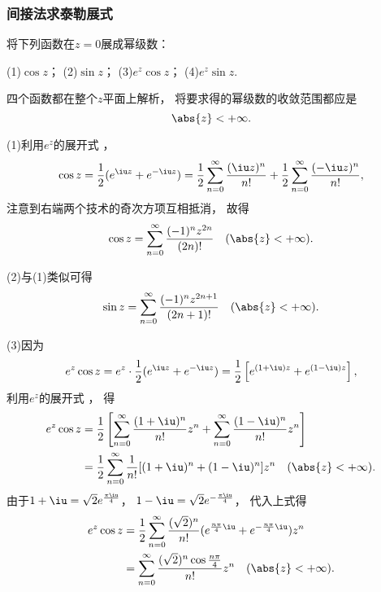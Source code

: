 \subsubsection{间接法求泰勒展式}
\begin{example}
将下列函数在\(z = 0\)展成幂级数：

(1)\(\cos z\)； \hfill (2)\(\sin z\)； \hfill (3)\(e^z \cos z\)； \hfill (4)\(e^z \sin z\).
\begin{solution}
四个函数都在整个\(z\)平面上解析，
将要求得的幂级数的收敛范围都应是\begin{equation*}
	\abs{z}<+\infty.
\end{equation*}

(1)利用\(e^z\)的展开式 ，
\begin{equation*}
	\cos z = \frac12 (e^{\iu z} + e^{-\iu z})
	= \frac12 \sum_{n=0}^\infty \frac{(\iu z)^n}{n!} + \frac12 \sum_{n=0}^\infty \frac{(-\iu z)^n}{n!},
\end{equation*}
注意到右端两个技术的奇次方项互相抵消，
故得\begin{equation}\label{equation:解析函数的级数表示.余弦函数的泰勒展式}
	\cos z = \sum_{n=0}^\infty \frac{(-1)^n z^{2n}}{(2n)!}
	\quad(\abs{z}<+\infty).
\end{equation}

(2)与(1)类似可得\begin{equation}\label{equation:解析函数的级数表示.正弦函数的泰勒展式}
	\sin z = \sum_{n=0}^\infty \frac{(-1)^n z^{2n+1}}{(2n+1)!}
	\quad(\abs{z}<+\infty).
\end{equation}

(3)因为\begin{equation*}
	e^z \cos z = e^z \cdot \frac12 (e^{\iu z} + e^{-\iu z})
	= \frac12 \left[e^{(1+\iu)z} + e^{(1-\iu)z}\right],
\end{equation*}
利用\(e^z\)的展开式 ，
得\begin{align*}
	e^z \cos z
	&= \frac12 \left[
			\sum_{n=0}^\infty \frac{(1+\iu)^n}{n!} z^n
			+ \sum_{n=0}^\infty \frac{(1-\iu)^n}{n!} z^n
		\right] \\
	&= \frac12 \sum_{n=0}^\infty \frac1{n!} [(1+\iu)^n+(1-\iu)^n] z^n
	\quad(\abs{z}<+\infty).
\end{align*}
由于\(1+\iu=\sqrt{2} e^{\frac{\pi\iu}{4}}\)，
\(1-\iu=\sqrt{2} e^{-\frac{\pi\iu}{4}}\)，
代入上式得\begin{equation}
	\begin{split}
		e^z \cos z
		&= \frac12
			\sum_{n=0}^\infty
			\frac{(\sqrt{2})^n}{n!}
			(e^{\frac{n\pi}{4}\iu}+e^{-\frac{n\pi}{4}\iu}) z^n \\
		&= \sum_{n=0}^\infty \frac{(\sqrt{2})^n \cos\frac{n\pi}{4}}{n!} z^n
		\quad(\abs{z}<+\infty).
	\end{split}
\end{equation}


\end{solution}
\end{example}
